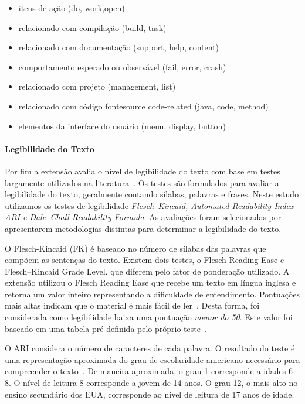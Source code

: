 \begin{itemize}

    \item itens de ação (do, work,open)
    \item relacionado com compilação (build, task)
    \item relacionado com documentação (support, help, content)
    \item comportamento esperado ou observável (fail, error, crash)
    \item relacionado com projeto (management, list)
    \item relacionado com código fontesource code-related (java, code, method)
    \item elementos da interface do usuário (menu, display, button)

\end{itemize}

\paragraph{Legibilidade do Texto}
\label{par:legibilidade_do_texto}

Por fim a extensão avalia o nível de legibilidade do texto com base em testes
largamente utilizados na literatura~\cite{Si:2001:SMS:502585.502695}. Os testes
são formulados para avaliar a legibilidade do texto, geralmente contando
sílabas, palavras e frases. Neste estudo utilizamos os testes de legibilidade
\textit{Flesch–Kincaid, Automated Readability Index \@-\@ ARI e Dale–Chall
    Readability Formula}. As avaliações foram selecionadas por apresentarem
metodologias distintas para determinar a legibilidade do texto.

O Flesch-Kincaid (FK) é baseado no número de sílabas das palavras que compõem as
sentenças do texto. Existem dois testes, o Flesch Reading Ease e Flesch–Kincaid
Grade Level, que diferem pelo fator de ponderação utilizado. A extensão utilizou
o Flesch Reading Ease que recebe um texto em língua inglesa e retorna um valor
inteiro representando a dificuldade de entendimento. Pontuações mais altas
indicam que o material é mais fácil de ler~\cite{kincaid1975derivation}. Desta
forma, foi considerada como legibilidade baixa uma pontuação \textit{menor do
    50}. Este valor foi baseado em uma tabela pré-definida pelo próprio
teste~\cite{kincaid1975derivation}.

O ARI considera o número de caracteres de cada palavra. O resultado do teste é
uma representação aproximada do grau de escolaridade americano necessário para
compreender o texto~\cite{senter1967automated}. De maneira aproximada, o grau 1
corresponde a idades 6\@-\@8. O nível de leitura 8 corresponde a jovem de 14
anos. O grau 12, o mais alto no ensino secundário dos EUA, corresponde ao nível
de leitura de 17 anos de idade.

